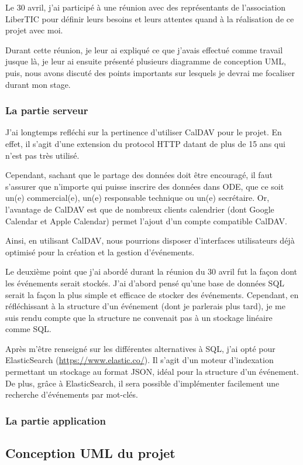 Le 30 avril, j'ai participé à une réunion avec des représentants de l'association LiberTIC pour définir leurs besoins et leurs attentes quand à la réalisation de ce projet avec moi.

Durant cette réunion, je leur ai expliqué ce que j'avais effectué comme travail jusque là, je leur ai ensuite présenté plusieurs diagramme de conception UML, puis, nous avons discuté des points importants sur lesquels je devrai me focaliser durant mon stage.

\subsubsection*{La partie serveur}

J'ai longtemps refléchi sur la pertinence d'utiliser CalDAV pour le projet. En effet, il s'agit d'une extension du protocol HTTP datant de plus de 15 ans qui n'est pas très utilisé.

Cependant, sachant que le partage des données doit être encouragé, il faut s'assurer que n'importe qui puisse inscrire des données dans ODE, que ce soit un(e) commercial(e), un(e) responsable technique ou un(e) secrétaire. Or, l'avantage de CalDAV est que de nombreux clients calendrier (dont Google Calendar et Apple Calendar) permet l'ajout d'un compte compatible CalDAV.

Ainsi, en utilisant CalDAV, nous pourrions disposer d'interfaces utilisateurs déjà optimisé pour la création et la gestion d'événements.

Le deuxième point que j'ai abordé durant la réunion du 30 avril fut la façon dont les événements serait stockés. J'ai d'abord pensé qu'une base de données SQL serait la façon la plus simple et efficace de stocker des événements. Cependant, en réfléchissant à la structure d'un événement (dont je parlerais plus tard), je me suis rendu compte que la structure ne convenait pas à un stockage linéaire comme SQL.

Après m'être renseigné sur les différentes alternatives à SQL, j'ai opté pour ElasticSearch (\url{https://www.elastic.co/}). Il s'agit d'un moteur d'indexation permettant un stockage au format JSON, idéal pour la structure d'un événement. De plus, grâce à ElasticSearch, il sera possible d'implémenter facilement une recherche d'événements par mot-clés.

\subsubsection*{La partie application}

\subsection{Conception UML du projet}